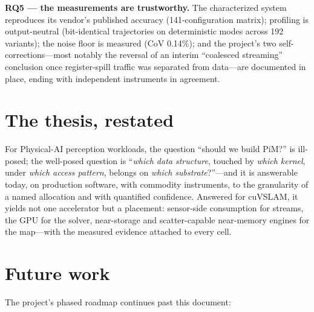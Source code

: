 \textbf{RQ5 --- the measurements are trustworthy.} The characterized system
reproduces its vendor's published accuracy (141-configuration matrix);
profiling is output-neutral (bit-identical trajectories on deterministic
modes across 192 variants); the noise floor is measured (CoV 0.14\%); and
the project's two self-corrections---most notably the reversal of an
interim ``coalesced streaming'' conclusion once register-spill traffic was
separated from data---are documented in place, ending with independent
instruments in agreement.

\section{The thesis, restated}

For Physical-AI perception workloads, the question ``should we build PiM?''
is ill-posed; the well-posed question is ``\emph{which data structure},
touched by \emph{which kernel}, under \emph{which access pattern}, belongs
on \emph{which substrate}?''---and it is answerable today, on production
software, with commodity instruments, to the granularity of a named
allocation and with quantified confidence. Answered for cuVSLAM, it yields
not one accelerator but a placement: sensor-side consumption for streams,
the GPU for the solver, near-storage and scatter-capable near-memory
engines for the map---with the measured evidence attached to every cell.

\section{Future work}
\label{sec:roadmap}

The project's phased roadmap continues past this document:

